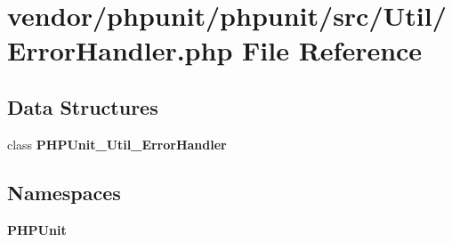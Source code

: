 \section{vendor/phpunit/phpunit/src/\+Util/\+Error\+Handler.php File Reference}
\label{phpunit_2phpunit_2src_2_util_2_error_handler_8php}
\subsection*{Data Structures}
\begin{DoxyCompactItemize}
\item 
class {\bf P\+H\+P\+Unit\+\_\+\+Util\+\_\+\+Error\+Handler}
\end{DoxyCompactItemize}
\subsection*{Namespaces}
\begin{DoxyCompactItemize}
\item 
 {\bf P\+H\+P\+Unit}
\end{DoxyCompactItemize}

